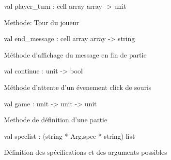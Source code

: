 \documentclass[11pt]{article}
\begin{document}
\label{val:Othello.player-underscoreturn}\begin{ocamldoccode}
val player_turn : cell array array -> unit
\end{ocamldoccode}
\begin{ocamldocdescription}
Methode: Tour du joueur


\end{ocamldocdescription}




\label{val:Othello.end-underscoremessage}\begin{ocamldoccode}
val end_message : cell array array -> string
\end{ocamldoccode}
\begin{ocamldocdescription}
Méthode d'affichage du message en fin de partie


\end{ocamldocdescription}




\label{val:Othello.continue}\begin{ocamldoccode}
val continue : unit -> bool
\end{ocamldoccode}
\begin{ocamldocdescription}
Méthode d'attente d'un évenement click de souris


\end{ocamldocdescription}




\label{val:Othello.game}\begin{ocamldoccode}
val game : unit -> unit -> unit
\end{ocamldoccode}
\begin{ocamldocdescription}
Methode de définition d'une partie


\end{ocamldocdescription}




\label{val:Othello.speclist}\begin{ocamldoccode}
val speclist : (string * Arg.spec * string) list
\end{ocamldoccode}
\begin{ocamldocdescription}
Définition des spécifications et des arguments possibles


\end{ocamldocdescription}
\end{document}
